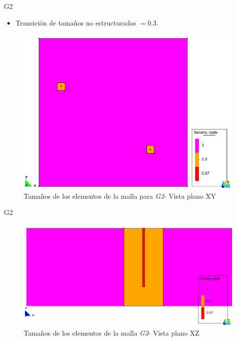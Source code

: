 \documentclass[spanish]{beamer}
\begin{document}
\begin{frame}{G2}\begin{center}
\begin{itemize}
\item Transición de tamaños no estructurados $=0.3$.
\end{itemize}
\begin{figure}[tbhp]
\centerline{\includegraphics[scale=0.21]{../img/200m/200_xy_tam_malla}}
\caption{Tamaños de los elementos de la malla para \emph{G2}- Vista plano XY}
\label{200_xy_tam_malla}
\end{figure}
\end{center}\end{frame}
%
\begin{frame}{G2}\begin{center}
\begin{figure}[tbhp]
\centerline{\includegraphics[scale=0.22]{../img/200m/200_xz_tam_malla}}
\caption{Tamaños de los elementos de la malla \emph{G2}- Vista plano XZ}
\label{200_xz_tam_malla}
\end{figure}
\end{center}\end{frame}
\end{document}
